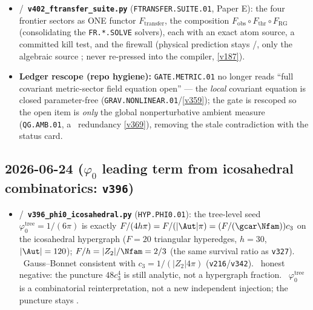 \begin{itemize}
\item \mE/\mC\ \textbf{\texttt{v402\_ftransfer\_suite.py}} (\texttt{FTRANSFER.SUITE.01}, Paper E): the four frontier sectors as ONE functor $F_{\mathrm{transfer}}$, the composition $F_{\mathrm{obs}}\circ F_{\mathrm{thr}}\circ F_{\mathrm{RG}}$ (consolidating the \texttt{FR.*.SOLVE} solvers), each with an exact atom source, a committed kill test, and the firewall (physical prediction stays \mC/\mO, only the algebraic source \mE; never re-pressed into the compiler, \vref{v187}).
\item \textbf{Ledger rescope (repo hygiene):} \texttt{GATE.METRIC.01} no longer reads ``full covariant metric-sector field equation open'' --- the \emph{local} covariant equation is closed parameter-free (\texttt{GRAV.NONLINEAR.01}/\vref{v359}); the gate is rescoped so the open item is \emph{only} the global nonperturbative ambient measure (\texttt{QG.AMB.01}, a \mC\ redundancy \vref{v369}), removing the stale contradiction with the status card.
\end{itemize}

\subsection*{2026-06-24 ($\varphi_0$ leading term from icosahedral combinatorics: \texttt{v396})}
\begin{itemize}
  \item \mE/\mC\ \textbf{\texttt{v396\_phi0\_icosahedral.py}} (\texttt{HYP.PHI0.01}): the tree-level seed $\varphi_0^{\mathrm{tree}}=1/(6\pi)$ is exactly $F/(4h\pi)=F/(|\Aut|\pi)=(F/(\gcar\Nfam))c_3$ on the icosahedral hypergraph ($F=20$ triangular hyperedges, $h=30$, $|\Aut|=120$); $F/h=|Z_2|/\Nfam=2/3$ (the same survival ratio as \texttt{v327}). \mE\ Gauss--Bonnet consistent with $c_3=1/(|Z_2|4\pi)$ (\texttt{v216}/\texttt{v342}). \mE\ honest negative: the puncture $48c_3^4$ is still analytic, not a hypergraph fraction. \mC\ $\varphi_0^{\mathrm{tree}}$ is a combinatorial reinterpretation, not a new independent injection; the puncture stays \mO.
\end{itemize}

